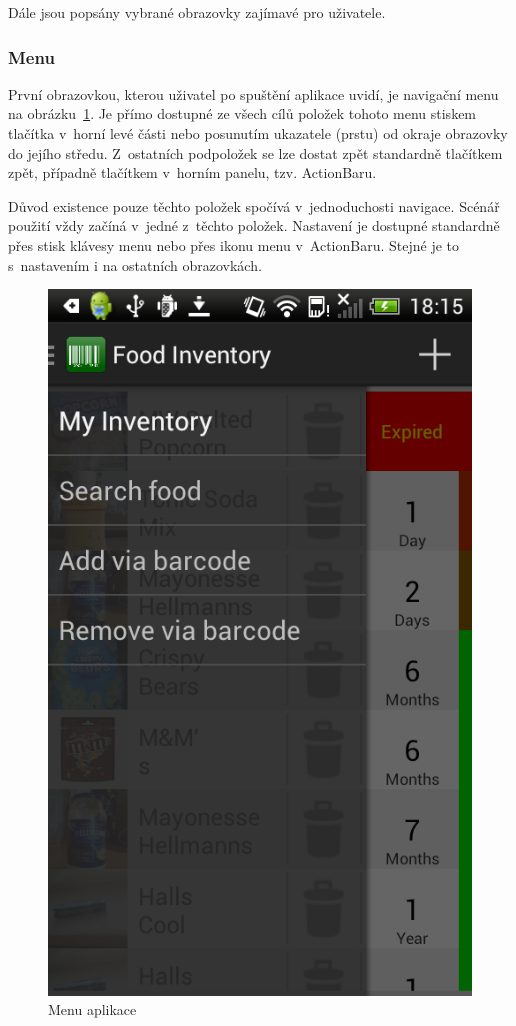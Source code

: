 \documentclass[thesis=B,czech]{FITthesis}[2013/10/20]
\begin{document}
Dále jsou popsány vybrané obrazovky zajímavé pro uživatele.

\clearpage

\subsubsection{Menu}

První obrazovkou, kterou uživatel po spuštění aplikace uvidí, je navigační menu na obrázku~\ref{fig:AppMenu}. Je přímo dostupné ze všech cílů položek tohoto menu stiskem tlačítka v~horní levé části nebo posunutím ukazatele (prstu) od okraje obrazovky do jejího středu. Z~ostatních podpoložek se lze dostat zpět standardně tlačítkem zpět, případně tlačítkem v~horním panelu, tzv. ActionBaru.

Důvod existence pouze těchto položek spočívá v~jednoduchosti navigace. Scénář použití vždy začíná v~jedné z~těchto položek. Nastavení je dostupné standardně přes stisk klávesy menu nebo přes ikonu menu v~ActionBaru. Stejné je to s~nastavením i na ostatních obrazovkách.

\begin{figure}[H]
  \centering
  \includegraphics[scale=0.4]{screenshots/app_menu.png}
  \caption{Menu aplikace}
  \label{fig:AppMenu}
\end{figure}
\end{document}
